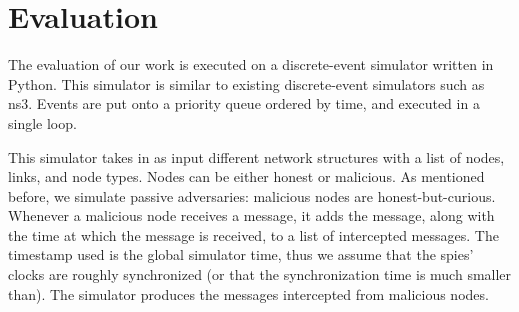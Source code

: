 \section{Evaluation}

The evaluation of our work is executed on a discrete-event simulator written in Python. This simulator is similar to existing discrete-event simulators such as ns3. Events are put onto a priority queue ordered by time, and executed in a single loop.

This simulator takes in as input different network structures with a list of nodes, links, and node types. Nodes can be either honest or malicious. As mentioned before, we simulate passive adversaries: malicious nodes are honest-but-curious. Whenever a malicious node receives a message, it adds the message, along with the time at which the message is received, to a list of intercepted messages. The timestamp used is the global simulator time, thus we assume that the spies' clocks are roughly synchronized (or that the synchronization time is much smaller than). 
The simulator produces the messages intercepted from malicious nodes.

